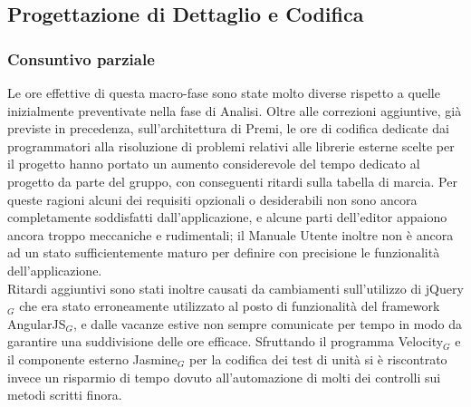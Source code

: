 \clearpage
\subsection{Progettazione di Dettaglio e Codifica}

\subsubsection{Consuntivo parziale}
Le ore effettive di questa macro-fase sono state molto diverse rispetto a quelle inizialmente preventivate nella fase di Analisi. Oltre alle correzioni aggiuntive, già previste in precedenza, sull'architettura di Premi, le ore di codifica dedicate dai programmatori alla risoluzione di problemi relativi alle librerie esterne scelte per il progetto hanno portato un aumento considerevole del tempo dedicato al progetto da parte del gruppo, con conseguenti ritardi sulla tabella di marcia. Per queste ragioni alcuni dei requisiti opzionali o desiderabili non sono ancora completamente soddisfatti dall'applicazione, e alcune parti dell'editor appaiono ancora troppo meccaniche e rudimentali; il Manuale Utente inoltre non è ancora ad un stato sufficientemente maturo per definire con precisione le funzionalità dell'applicazione. \\ 
Ritardi aggiuntivi sono stati inoltre causati da cambiamenti sull'utilizzo di jQuery$_G$ che era stato erroneamente utilizzato al posto di funzionalità del framework AngularJS$_G$, e dalle vacanze estive non sempre comunicate per tempo in modo da garantire una suddivisione delle ore efficace.
Sfruttando il programma Velocity$_G$ e il componente esterno Jasmine$_G$ per la codifica dei test di unità si è riscontrato invece un risparmio di tempo dovuto all'automazione di molti dei controlli sui metodi scritti finora. 

